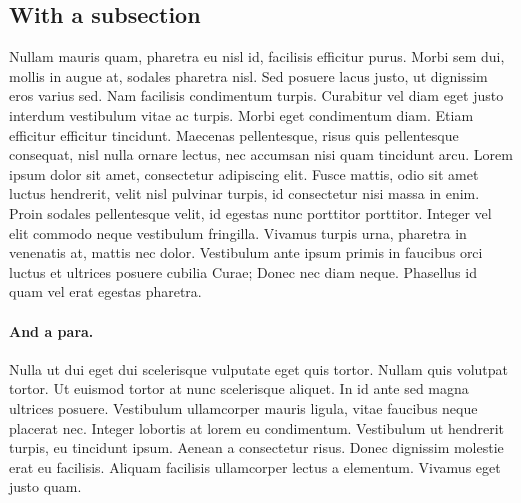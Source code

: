 \subsection{With a subsection}
Nullam mauris quam, pharetra eu nisl id, facilisis efficitur
purus. Morbi sem dui, mollis in augue at, sodales pharetra nisl. Sed
posuere lacus justo, ut dignissim eros varius sed. Nam facilisis
condimentum turpis. Curabitur vel diam eget justo interdum vestibulum
vitae ac turpis. Morbi eget condimentum diam. Etiam efficitur
efficitur tincidunt. Maecenas pellentesque, risus quis pellentesque
consequat, nisl nulla ornare lectus, nec accumsan nisi quam tincidunt
arcu. Lorem ipsum dolor sit amet, consectetur adipiscing elit. Fusce
mattis, odio sit amet luctus hendrerit, velit nisl pulvinar turpis, id
consectetur nisi massa in enim. Proin sodales pellentesque velit, id
egestas nunc porttitor porttitor. Integer vel elit commodo neque
vestibulum fringilla. Vivamus turpis urna, pharetra in venenatis at,
mattis nec dolor. Vestibulum ante ipsum primis in faucibus orci luctus
et ultrices posuere cubilia Curae; Donec nec diam neque. Phasellus id
quam vel erat egestas pharetra.

\paragraph{And a para.} Nulla ut dui eget dui scelerisque vulputate eget quis tortor. Nullam
quis volutpat tortor. Ut euismod tortor at nunc scelerisque
aliquet. In id ante sed magna ultrices posuere. Vestibulum ullamcorper
mauris ligula, vitae faucibus neque placerat nec. Integer lobortis at
lorem eu condimentum. Vestibulum ut hendrerit turpis, eu tincidunt
ipsum. Aenean a consectetur risus. Donec dignissim molestie erat eu
facilisis. Aliquam facilisis ullamcorper lectus a elementum. Vivamus
eget justo quam.
